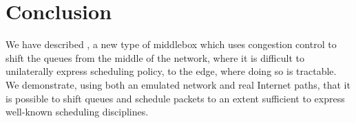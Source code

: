 \section{Conclusion}\label{s:concl}
We have described \name, a new type of middlebox which uses congestion control to shift the queues from the middle of the network, where it is difficult to unilaterally express scheduling policy, to the edge, where doing so is tractable.
We demonstrate, using both an emulated network and real Internet paths, that it is possible to shift queues and schedule packets to an extent sufficient to express well-known scheduling disciplines. 
